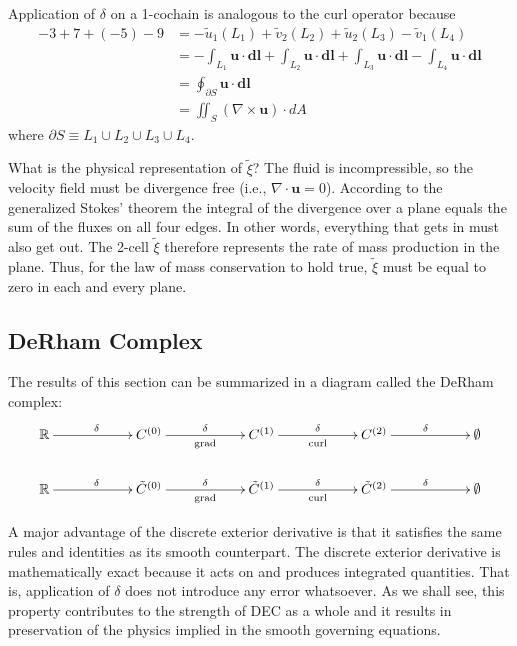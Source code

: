 Application of $\delta$ on a 1-cochain is analogous to the curl operator because
\begin{equation}
    \begin{split}
        -3 + 7 + (-5) - 9 &= -\tilde{u}_1(L_1) + \tilde{v}_2(L_2) + \tilde{u}_2(L_3) - \tilde{v}_1(L_4) \\
        &= -\int_{L_1} \mathbf{u} \cdot \mathbf{dl} + \int_{L_2} \mathbf{u} \cdot \mathbf{dl} + \int_{L_3} \mathbf{u} \cdot \mathbf{dl} - \int_{L_4} \mathbf{u} \cdot \mathbf{dl} \\
        &= \oint_{\partial S} \mathbf{u} \cdot \mathbf{dl} \\
        &= \iint_{S} \left( \nabla \times \mathbf{u} \right) \cdot dA
    \end{split}
    \label{eq:curlExample}
\end{equation}
where $\partial S \equiv L_1 \cup L_2 \cup L_3 \cup L_4$. 

What is the physical representation of $\tilde{\xi}$? The fluid is incompressible, so the velocity field must be divergence free (i.e., $\nabla \cdot \mathbf{u} = 0$). According to the generalized Stokes' theorem the integral of the divergence over a plane equals the sum of the fluxes on all four edges. In other words, everything that gets in must also get out. The 2-cell $\tilde{\xi}$ therefore represents the rate of mass production in the plane. Thus, for the law of mass conservation to hold true, $\tilde{\xi}$ must be equal to zero in each and every plane.

\subsection{DeRham Complex}

The results of this section can be summarized in a diagram called the DeRham complex:
\begin{equation}
    \begin{gathered}
        \xymatrix@C=13ex{
            \mathbb{R} \ar[r]^{\delta} & C^{(0)} \ar[r]^{\delta}_{\text{grad}} & C^{(1)} \ar[r]^{\delta}_{\text{curl}} & C^{(2)} \ar[r]^{\delta} & \emptyset \\
            \mathbb{R} \ar[r]^{\delta} & \tilde{C}^{(0)} \ar[r]^{\delta}_{\text{grad}} & \tilde{C}^{(1)} \ar[r]^{\delta}_{\text{curl}} & \tilde{C}^{(2)} \ar[r]^{\delta} & \emptyset
        }
    \end{gathered}
\end{equation}

A major advantage of the discrete exterior derivative is that it satisfies the same rules and identities as its smooth counterpart. The discrete exterior derivative is mathematically exact because it acts on and produces integrated quantities. That is, application of $\delta$ does not introduce any error whatsoever. As we shall see, this property contributes to the strength of DEC as a whole and it results in preservation of the physics implied in the smooth governing equations.


